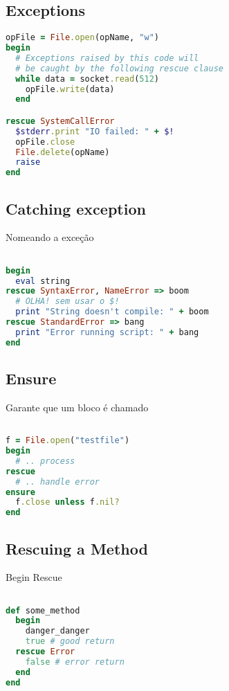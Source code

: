 \documentclass[serif,mathserif]{article}
\begin{document}
\subsection{Exceptions}

\begin{lstlisting}[language=ruby]
opFile = File.open(opName, "w")
begin
  # Exceptions raised by this code will
  # be caught by the following rescue clause
  while data = socket.read(512)
    opFile.write(data)
  end

rescue SystemCallError
  $stderr.print "IO failed: " + $!
  opFile.close
  File.delete(opName)
  raise
end
\end{lstlisting}

\subsection{Catching exception}

Nomeando a exceção

\begin{lstlisting}[language=ruby]

begin
  eval string
rescue SyntaxError, NameError => boom
  # OLHA! sem usar o $!
  print "String doesn't compile: " + boom
rescue StandardError => bang
  print "Error running script: " + bang
end
\end{lstlisting}

\subsection{Ensure}

Garante que um bloco é chamado

\begin{lstlisting}[language=ruby]

f = File.open("testfile")
begin
  # .. process
rescue
  # .. handle error
ensure
  f.close unless f.nil?
end
\end{lstlisting}

\subsection{Rescuing a Method}

Begin Rescue

\begin{lstlisting}[language=ruby]

def some_method
  begin
    danger_danger
    true # good return
  rescue Error
    false # error return
  end
end
\end{lstlisting}
\end{document}
